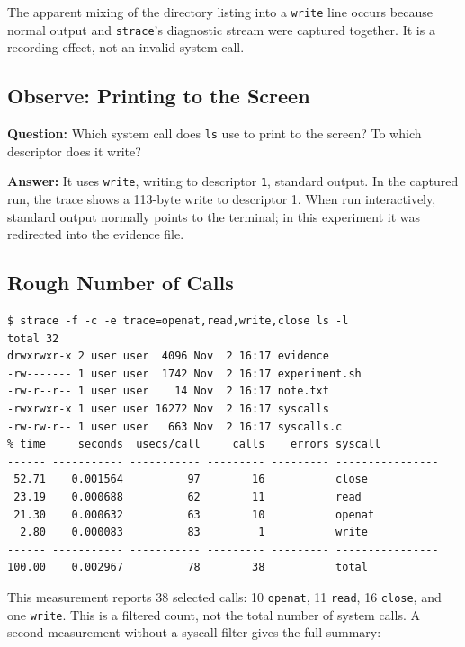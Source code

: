 \documentclass[12pt,a4paper]{article}
\begin{document}
The apparent mixing of the directory listing into a \texttt{write} line occurs
because normal output and \texttt{strace}'s diagnostic stream were captured together.
It is a recording effect, not an invalid system call.

\subsection{Observe: Printing to the Screen}
\textbf{Question:} Which system call does \texttt{ls} use to print to the screen?
To which descriptor does it write?

\textbf{Answer:} It uses \texttt{write}, writing to descriptor \texttt{1}, standard
output. In the captured run, the trace shows a 113-byte write to descriptor 1.
When run interactively, standard output normally points to the terminal; in this
experiment it was redirected into the evidence file.

\subsection{Rough Number of Calls}

\begin{lstlisting}[caption={Summary restricted to the four selected system calls}]
$ strace -f -c -e trace=openat,read,write,close ls -l
total 32
drwxrwxr-x 2 user user  4096 Nov  2 16:17 evidence
-rw------- 1 user user  1742 Nov  2 16:17 experiment.sh
-rw-r--r-- 1 user user    14 Nov  2 16:17 note.txt
-rwxrwxr-x 1 user user 16272 Nov  2 16:17 syscalls
-rw-rw-r-- 1 user user   663 Nov  2 16:17 syscalls.c
% time     seconds  usecs/call     calls    errors syscall
------ ----------- ----------- --------- --------- ----------------
 52.71    0.001564          97        16           close
 23.19    0.000688          62        11           read
 21.30    0.000632          63        10           openat
  2.80    0.000083          83         1           write
------ ----------- ----------- --------- --------- ----------------
100.00    0.002967          78        38           total
\end{lstlisting}

This measurement reports 38 selected calls: 10 \texttt{openat}, 11 \texttt{read},
16 \texttt{close}, and one \texttt{write}. This is a filtered count, not the total
number of system calls. A second measurement without a syscall filter gives the
full summary:
\end{document}
